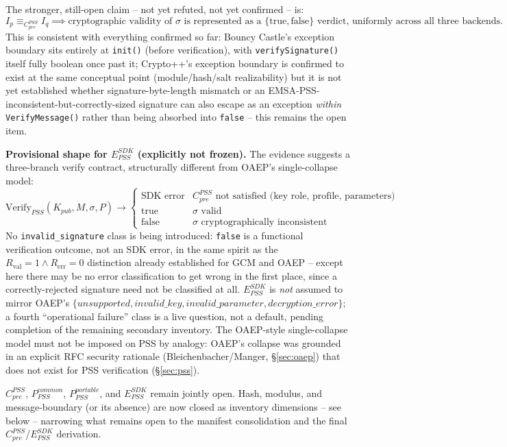 \documentclass[11pt,a4paper]{article}
\begin{document}
The stronger, still-open claim -- not yet refuted, not yet confirmed -- is:
\[I_p \equiv_{C_{pre}^{PSS}} I_q \implies \text{cryptographic validity of } \sigma \text{ is represented as a } \{\text{true}, \text{false}\} \text{ verdict, uniformly across all three backends.}\]
This is consistent with everything confirmed so far: Bouncy Castle's exception boundary sits entirely at \texttt{init()} (before verification), with \texttt{verifySignature()} itself fully boolean once past it; Crypto++'s exception boundary is confirmed to exist at the same conceptual point (module/hash/salt realizability) but it is not yet established whether signature-byte-length mismatch or an EMSA-PSS-inconsistent-but-correctly-sized signature can also escape as an exception \emph{within} \texttt{VerifyMessage()} rather than being absorbed into \texttt{false} -- this remains the open item.

\textbf{Provisional shape for $E_{PSS}^{SDK}$ (explicitly not frozen).} The evidence suggests a three-branch verify contract, structurally different from OAEP's single-collapse model:
\[
\text{Verify}_{PSS}(K_{pub}, M, \sigma, P) \to
\begin{cases}
\text{SDK error} & C_{pre}^{PSS} \text{ not satisfied (key role, profile, parameters)} \\
\text{true} & \sigma \text{ valid} \\
\text{false} & \sigma \text{ cryptographically inconsistent}
\end{cases}
\]
No \texttt{invalid\_signature} class is being introduced: \texttt{false} is a functional verification outcome, not an SDK error, in the same spirit as the $R_{\text{val}}=1 \land R_{\text{err}}=0$ distinction already established for GCM and OAEP -- except here there may be no error classification to get wrong in the first place, since a correctly-rejected signature need not be classified at all. $E_{PSS}^{SDK}$ is \emph{not} assumed to mirror OAEP's $\{unsupported, invalid\_key, invalid\_parameter, decryption\_error\}$; a fourth ``operational failure'' class is a live question, not a default, pending completion of the remaining secondary inventory. The OAEP-style single-collapse model must not be imposed on PSS by analogy: OAEP's collapse was grounded in an explicit RFC security rationale (Bleichenbacher/Manger, \S\ref{sec:oaep}) that does not exist for PSS verification (\S\ref{sec:pss}).

$C_{pre}^{PSS}$, $P_{PSS}^{common}$, $P_{PSS}^{portable}$, and $E_{PSS}^{SDK}$ remain jointly open. Hash, modulus, and message-boundary (or its absence) are now closed as inventory dimensions -- see below -- narrowing what remains open to the manifest consolidation and the final $C_{pre}^{PSS}$/$E_{PSS}^{SDK}$ derivation.
\end{document}
